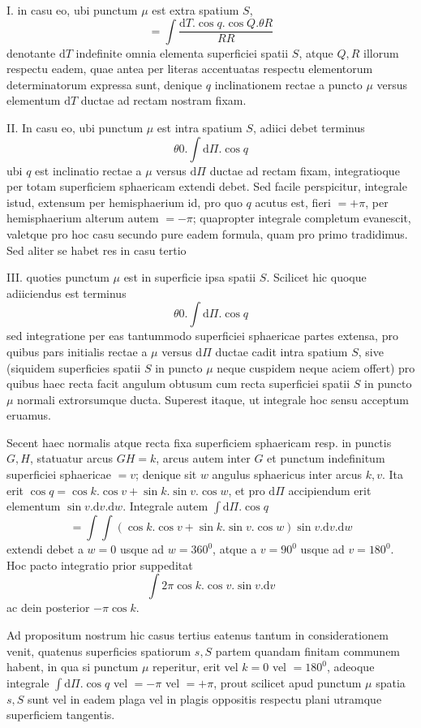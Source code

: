 I. in casu eo, ubi punctum $\mu$ est extra spatium $S$,
\[
=\int\frac{\mathrm{d}T.\cos q.\cos Q.\theta R}{RR}
\]
denotante $\mathrm{d}T$ indefinite omnia elementa superficiei spatii $S$, atque $Q,R$ illorum respectu eadem, quae antea per literas accentuatas respectu elementorum determinatorum expressa sunt, denique $q$ inclinationem rectae a puncto $\mu$ versus elementum $\mathrm{d}T$ ductae ad rectam nostram fixam.

II. In casu eo, ubi punctum $\mu$ est intra spatium $S$, adiici debet terminus
\[
\theta0.\int\mathrm{d}\Pi.\cos q
\]
ubi $q$ est inclinatio rectae a $\mu$ versus $\mathrm{d}\Pi$ ductae ad rectam fixam, integratioque per totam superficiem sphaericam extendi debet. Sed facile perspicitur, integrale istud, extensum per hemisphaerium id, pro quo $q$ acutus est, fieri $=+\pi$, per hemisphaerium alterum autem $=-\pi$; quapropter integrale completum evanescit, valetque pro hoc casu secundo pure eadem formula, quam pro primo tradidimus. Sed aliter se habet res in casu tertio

III. quoties punctum $\mu$ est in superficie ipsa spatii $S$. Scilicet hic quoque adiiciendus est terminus
\[
\theta0.\int\mathrm{d}\Pi.\cos q
\]
sed integratione per eas tantummodo superficiei sphaericae partes extensa, pro quibus pars initialis rectae a $\mu$ versus $\mathrm{d}\Pi$ ductae cadit intra spatium $S$, sive (siquidem superficies spatii $S$ in puncto $\mu$ neque cuspidem neque aciem offert) pro quibus haec recta facit angulum obtusum cum recta superficiei spatii $S$ in puncto $\mu$ normali extrorsumque ducta. Superest itaque, ut integrale hoc sensu acceptum eruamus.

Secent haec normalis atque recta fixa superficiem sphaericam resp. in punctis $G,H$, statuatur arcus $GH=k$, arcus autem inter $G$ et punctum indefinitum superficiei sphaericae $=v$; denique sit $w$ angulus sphaericus inter arcus $k,v$. Ita erit $\cos q=\cos k.\cos v+\sin k.\sin v.\cos w$, et pro $\mathrm{d}\Pi$ accipiendum erit elementum $\sin v.\mathrm{d}v.\mathrm{d}w$. Integrale autem $\int\mathrm{d}\Pi.\cos q$
\[
=\int\int(\cos k.\cos v+\sin k.\sin v.\cos w)\sin v.\mathrm{d}v.\mathrm{d}w
\]
extendi debet a $w=0$ usque ad $w=360^0$, atque a $v=90^0$ usque ad $v=180^0$. Hoc pacto integratio prior suppeditat
\[
\int2\pi\cos k.\cos v.\sin v.\mathrm{d}v
\]
ac dein posterior $-\pi\cos k$.

Ad propositum nostrum hic casus tertius eatenus tantum in considerationem venit, quatenus superficies spatiorum $s,S$ partem quandam finitam communem habent, in qua si punctum $\mu$ reperitur, erit vel $k=0$ vel $=180^0$, adeoque integrale $\int\mathrm{d}\Pi.\cos q$ vel $=-\pi$ vel $=+\pi$, prout scilicet apud punctum $\mu$ spatia $s,S$ sunt vel in eadem plaga vel in plagis oppositis respectu plani utramque superficiem tangentis.

